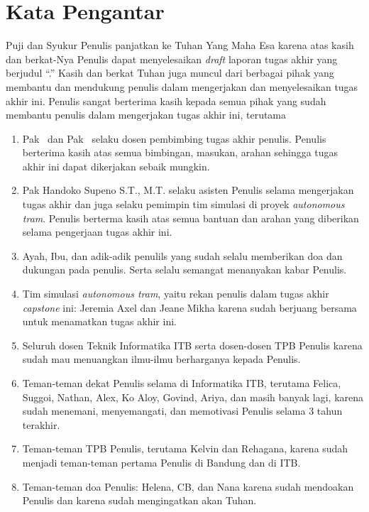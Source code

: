 \chapter*{Kata Pengantar}

Puji dan Syukur Penulis panjatkan ke Tuhan Yang Maha Esa karena atas kasih dan
berkat-Nya Penulis dapat menyelesaikan \textit{draft} laporan tugas akhir yang
berjudul ``\thetitle.'' Kasih dan berkat Tuhan juga muncul dari berbagai pihak
yang membantu dan mendukung penulis dalam mengerjakan dan menyelesaikan tugas
akhir ini. Penulis sangat berterima kasih kepada semua pihak yang sudah membantu
penulis dalam mengerjakan tugas akhir ini, terutama

\begin{enumerate}
	\item Pak \pembimbingSatu\ dan Pak \pembimbingDua\ selaku dosen pembimbing
	      tugas akhir penulis. Penulis berterima kasih atas semua bimbingan, masukan,
	      arahan sehingga tugas akhir ini dapat dikerjakan sebaik mungkin.
	\item Pak Handoko Supeno S.T., M.T. selaku asisten Penulis selama
	      mengerjakan tugas akhir dan juga selaku pemimpin tim simulasi di proyek
	      \textit{autonomous tram}. Penulis berterma kasih atas semua bantuan dan
	      arahan yang diberikan selama pengerjaan tugas akhir ini.
	\item Ayah, Ibu, dan adik-adik penulils yang sudah selalu memberikan doa dan
	      dukungan pada penulis. Serta selalu semangat menanyakan kabar Penulis.
	\item Tim simulasi \textit{autonomous tram}, yaitu rekan penulis dalam tugas
	      akhir \textit{capstone} ini: Jeremia Axel dan Jeane Mikha karena sudah
	      berjuang bersama untuk menamatkan tugas akhir ini.
	\item Seluruh dosen Teknik Informatika ITB serta dosen-dosen TPB Penulis
	      karena sudah mau menuangkan ilmu-ilmu berharganya kepada Penulis.
	\item Teman-teman dekat Penulis selama di Informatika ITB, terutama Felica,
	      Suggoi, Nathan, Alex, Ko Aloy, Govind, Ariya, dan masih banyak lagi, karena
	      sudah menemani, menyemangati, dan memotivasi Penulis selama 3 tahun
	      terakhir.
	\item Teman-teman TPB Penulis, terutama Kelvin dan Rehagana, karena sudah
	      menjadi teman-teman pertama Penulis di Bandung dan di ITB.
	\item Teman-teman doa Penulis: Helena, CB, dan Nana karena sudah mendoakan
	      Penulis dan karena sudah mengingatkan akan Tuhan.
\end{enumerate}
